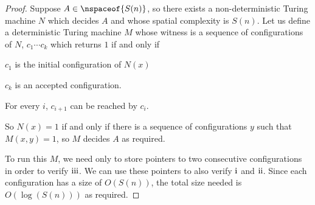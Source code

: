 \documentclass[10pt]{article}
\begin{document}
\begin{proof}

    \benum
        \item Suppose $A\in\nspaceof{S(n)}$, so there exists a non-deterministic Turing machine $N$ which decides $A$ and whose spatial complexity is $S(n)$.
        Let us define a deterministic Turing machine $M$ whose witness is a sequence of configurations of $N$, $c_1\cdots c_k$ which returns $1$ if and only if
        \benum
            \item $c_1$ is the initial configuration of $N(x)$
            \item $c_k$ is an accepted configuration.
            \item For every $i$, $c_{i+1}$ can be reached by $c_i$.
        \eenum

        So $N(x)=1$ if and only if there is a sequence of configurations $y$ such that $M(x,y)=1$, so $M$ decides $A$ as required.

        To run this $M$, we need only to store pointers to two consecutive configurations in order to verify $\rm iii$.
        We can use these pointers to also verify $\rm i$ and $\rm ii$.
        Since each configuration has a size of $O(S(n))$, the total size needed is $O(\log(S(n)))$ as required.
    \eenum

\end{proof}
\end{document}

